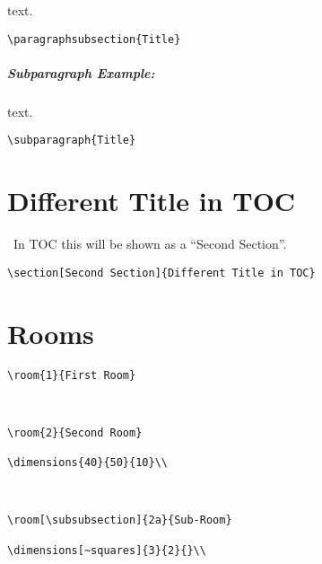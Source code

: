 \documentclass[itdr]{subfiles}
\begin{document}
 text. 

\begin{lstlisting}
\paragraphsubsection{Title}
\end{lstlisting}

\subparagraph{Subparagraph Example:} text. 

\noindent
\begin{lstlisting}
\subparagraph{Title}
\end{lstlisting}

\vfill

\section[Second Section]{Different Title in TOC}

\faHandPointUp~In TOC this will be shown as a ``Second Section''.

\begin{lstlisting}
\section[Second Section]{Different Title in TOC}
\end{lstlisting}

\break

\section{Rooms}


\lipsum[66]

\begin{lstlisting}
\room{1}{First Room}
\end{lstlisting}


\\
\lipsum[66]

\begin{lstlisting}
\room{2}{Second Room}

\dimensions{40}{50}{10}\\
\end{lstlisting}


\\
\lipsum[66]

\begin{lstlisting}
\room[\subsubsection]{2a}{Sub-Room}

\dimensions[~squares]{3}{2}{}\\
\end{lstlisting}
\end{document}
